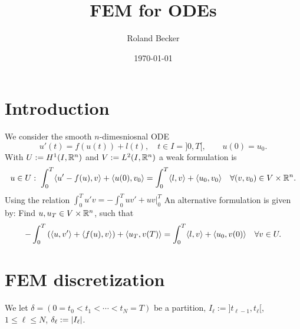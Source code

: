 \documentclass[english,12pt,a4paper]{article}
\title{FEM for ODEs}
\author{Roland Becker}
\date{\today}
\begin{document}
\maketitle
\setcounter{tocdepth}{2}
\tableofcontents
%
\section{Introduction}\label{sec:}
%
%
We consider the smooth $n$-dimesniosnal ODE
%
\begin{equation}\label{eq:ode}
u'(t) = f(u(t)) + l(t),\quad t\in I=]0,T[,\qquad u(0) = u_0.
\end{equation}
%
With $U:= H^1(I,\mathbb R^n)$ and $V:=L^2(I,\mathbb R^n)$ a weak formulation is
%
\begin{equation}\label{eq:ode_weak_primal}
u\in U:\; \int_0^T \langle u' - f(u),v\rangle + \langle u(0),v_0\rangle = \int_0^T \langle l,v\rangle + \langle u_0,v_0\rangle \quad\forall (v,v_0)\in V\times\mathbb R^n.
\end{equation}
%
Using the relation $\int_{0}^T u'v = - \int_{0}^T uv' + uv\vert_0^T$
An alternative formulation is given by: Find $u,u_T\in V\times\mathbb R^n$, such that
%
\begin{equation}\label{eq:ode_weak_dual}
-\int_0^T \left(\langle u,v'\rangle+ \langle f(u),v\rangle\right)+ \langle u_T,v(T)\rangle = \int_0^T \langle l,v\rangle + \langle u_0,v(0)\rangle \quad\forall v\in U.
\end{equation}
%
%
\section{FEM discretization}\label{sec:}
%
%
We let $\delta=(0=t_0<t_1<\cdots < t_N=T)$ be a partition, $I_{\ell}:=]t_{\ell-1},t_{\ell}[$, $1\le \ell\le N$, $\delta_{\ell}:=\left\vert{I_{\ell}}\right\vert$. 
\end{document}
